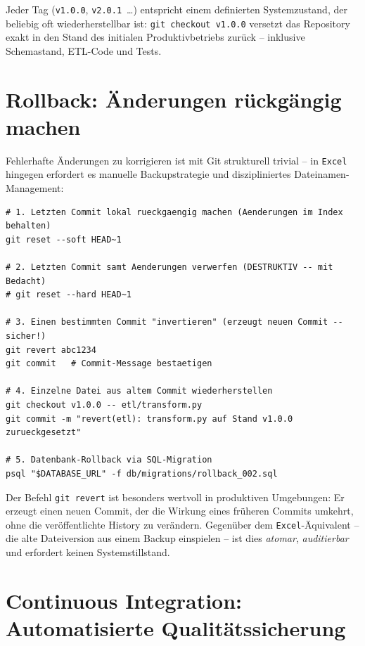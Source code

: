 \documentclass[12pt,a4paper]{report}
\theoremstyle{definition}
\theoremstyle{remark}
\newcommand{\excel}{\texttt{Excel}}
\newcommand{\code}[1]{\texttt{#1}}
\begin{document}
Jeder Tag (\code{v1.0.0}, \code{v2.0.1}~\ldots) entspricht einem
definierten Systemzustand, der beliebig oft wiederherstellbar ist:
\code{git checkout v1.0.0} versetzt das Repository exakt in den
Stand des initialen Produktivbetriebs zurück -- inklusive Schemastand,
ETL-Code und Tests.

\section{Rollback: Änderungen rückgängig machen}

Fehlerhafte Änderungen zu korrigieren ist mit Git strukturell trivial --
in \excel{} hingegen erfordert es manuelle Backupstrategie und
diszipliniertes Dateinamen-Management:

\begin{lstlisting}[style=bash, caption={Rollback-Szenarien mit Git}]
# 1. Letzten Commit lokal rueckgaengig machen (Aenderungen im Index behalten)
git reset --soft HEAD~1

# 2. Letzten Commit samt Aenderungen verwerfen (DESTRUKTIV -- mit Bedacht)
# git reset --hard HEAD~1

# 3. Einen bestimmten Commit "invertieren" (erzeugt neuen Commit -- sicher!)
git revert abc1234
git commit   # Commit-Message bestaetigen

# 4. Einzelne Datei aus altem Commit wiederherstellen
git checkout v1.0.0 -- etl/transform.py
git commit -m "revert(etl): transform.py auf Stand v1.0.0 zurueckgesetzt"

# 5. Datenbank-Rollback via SQL-Migration
psql "$DATABASE_URL" -f db/migrations/rollback_002.sql
\end{lstlisting}

Der Befehl \code{git revert} ist besonders wertvoll in produktiven Umgebungen:
Er erzeugt einen neuen Commit, der die Wirkung eines früheren Commits
umkehrt, ohne die veröffentlichte History zu verändern.
Gegenüber dem \excel-Äquivalent -- die alte Dateiversion aus einem
Backup einspielen -- ist dies \emph{atomar}, \emph{auditierbar} und
erfordert keinen Systemstillstand.

\section{Continuous Integration: Automatisierte Qualitätssicherung}
\end{document}
